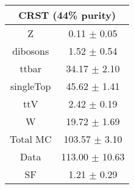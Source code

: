 \begin{tabular}{c|c}
\hline\hline
\multicolumn{2}{c}{\bf CRST (44\% purity)} \\ \hline 
Z & 0.11 $\pm$ 0.05 \\
dibosons & 1.52 $\pm$ 0.54 \\
ttbar & 34.17 $\pm$ 2.10 \\
singleTop & 45.62 $\pm$ 1.41 \\
ttV & 2.42 $\pm$ 0.19 \\
W & 19.72 $\pm$ 1.69 \\
\hline
Total MC & 103.57 $\pm$ 3.10 \\
Data & 113.00 $\pm$ 10.63 \\
 \hline
SF & 1.21 $\pm$ 0.29 \\
\hline\hline
\end{tabular}
